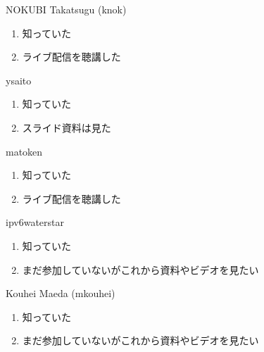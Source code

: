 \begin{prework}{ NOKUBI Takatsugu (knok) }
  \begin{enumerate}
  \item 知っていた
  \item ライブ配信を聴講した
  \end{enumerate}
\end{prework}

\begin{prework}{ ysaito }
  \begin{enumerate}
  \item 知っていた
  \item スライド資料は見た
  \end{enumerate}
\end{prework}

\begin{prework}{ matoken }
  \begin{enumerate}
  \item 知っていた
  \item ライブ配信を聴講した
  \end{enumerate}
\end{prework}

\begin{prework}{ ipv6waterstar }
  \begin{enumerate}
  \item 知っていた
  \item まだ参加していないがこれから資料やビデオを見たい
  \end{enumerate}
\end{prework}

\begin{prework}{ Kouhei Maeda (mkouhei) }
  \begin{enumerate}
  \item 知っていた
  \item まだ参加していないがこれから資料やビデオを見たい
  \end{enumerate}
\end{prework}
